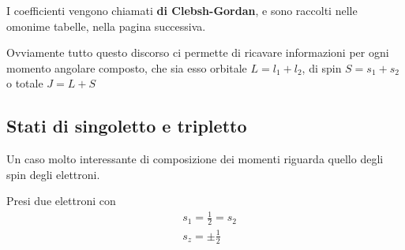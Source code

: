 I coefficienti vengono chiamati \textbf{di Clebsh-Gordan}, e sono raccolti nelle omonime tabelle, nella pagina successiva.
\newpage
\begin{figure}[!htb]
\end{figure}


Ovviamente tutto questo discorso ci permette di ricavare informazioni per ogni momento angolare composto, che sia esso orbitale $L=l_1+l_2$, di spin $S=s_1+s_2$ o totale $J= L+S$


\newpage

\subsection{Stati di singoletto e tripletto}

Un caso molto interessante di composizione dei momenti riguarda quello degli spin degli elettroni.

Presi due elettroni con
\begin{align}
&s_1=\frac{1}{2}=s_2 \\
&s_z=\pm \frac{1}{2}
\end{align}

